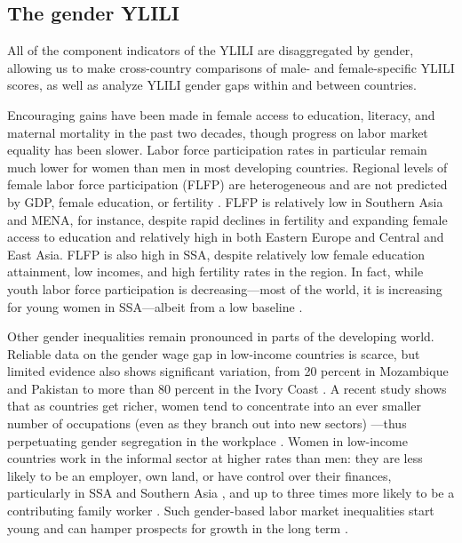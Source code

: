 \documentclass[
  a4paper, twoside, 12pt]{book}
\begin{document}
\hypertarget{the-gender-ylili}{%
\subsection{The gender YLILI}\label{the-gender-ylili}}

All of the component indicators of the YLILI are disaggregated by gender, allowing us to make cross-country comparisons of male- and female-specific YLILI scores, as well as analyze YLILI gender gaps within and between countries.

Encouraging gains have been made in female access to education, literacy, and maternal mortality in the past two decades, though progress on labor market equality has been slower. Labor force participation rates in particular remain much lower for women than men in most developing countries. Regional levels of female labor force participation (FLFP) are heterogeneous and are not predicted by GDP, female education, or fertility \autocite{klasen2019}. FLFP is relatively low in Southern Asia and MENA, for instance, despite rapid declines in fertility and expanding female access to education and relatively high in both Eastern Europe and Central and East Asia. FLFP is also high in SSA, despite relatively low female education attainment, low incomes, and high fertility rates in the region. In fact, while youth labor force participation is decreasing---most of the world, it is increasing for young women in SSA---albeit from a low baseline \autocite{ilo2020}.

Other gender inequalities remain pronounced in parts of the developing world. Reliable data on the gender wage gap in low-income countries is scarce, but limited evidence also shows significant variation, from 20 percent in Mozambique and Pakistan to more than 80 percent in the Ivory Coast \autocite{worldbank2011}. A recent study shows that as countries get richer, women tend to concentrate into an ever smaller number of occupations (even as they branch out into new sectors) ---thus perpetuating gender segregation in the workplace \autocite{borrowman2020}. Women in low-income countries work in the informal sector at higher rates than men: they are less likely to be an employer, own land, or have control over their finances, particularly in SSA and Southern Asia \autocite{ortiz-ospina2018}, and up to three times more likely to be a contributing family worker \autocite{bonnet2018}. Such gender-based labor market inequalities start young and can hamper prospects for growth in the long term \autocite{undp2019}.
\end{document}
